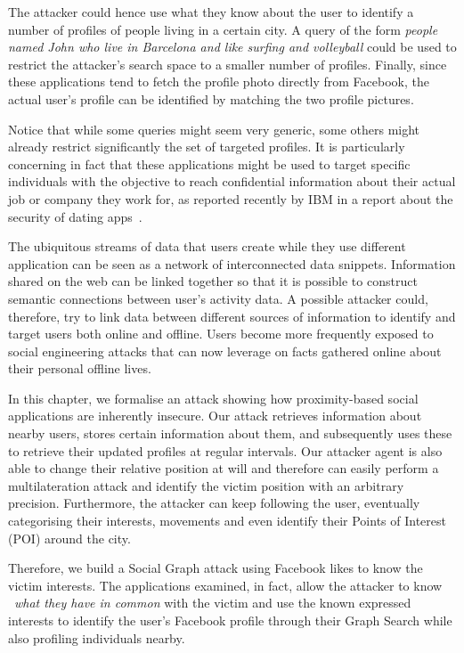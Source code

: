 The attacker could hence use what they know about the user to identify a number of profiles of people living in a certain city. A query of the form \emph{people named John who live in Barcelona and like surfing and volleyball} could be used to restrict the attacker's search space to a smaller number of profiles. Finally, since these applications tend to fetch the profile photo directly from Facebook, the actual user's profile can be identified by matching the two profile pictures.

Notice that while some queries might seem very generic, some others might already restrict significantly the set of targeted profiles. It is particularly concerning in fact that these applications might be used to target specific individuals with the objective to reach confidential information about their actual job or company they work for, as reported recently by IBM in a report about the security of dating apps~\cite{ibm2015report}.

The ubiquitous streams of data that users create while they use different application can be seen as a network of interconnected data snippets. Information shared on the web can be linked together so that it is possible to construct semantic connections between user's activity data. A possible attacker could, therefore, try to link data between different sources of information to identify and target users both online and offline. Users become more frequently exposed to social engineering attacks that can now leverage on facts gathered online about their personal offline lives.

In this chapter, we formalise an attack showing how proximity-based social applications are inherently insecure. Our attack retrieves information about nearby users, stores certain information about them, and subsequently uses these to retrieve their updated profiles at regular intervals. Our attacker agent is also able to change their relative position at will and therefore can easily perform a multilateration attack and identify the victim position with an arbitrary precision. Furthermore, the attacker can keep following the user, eventually categorising their interests, movements and even identify their Points of Interest (POI) around the city.

Therefore, we build a Social Graph attack using Facebook likes to know the victim interests. The applications examined, in fact, allow the attacker to know ~\emph{what they have in common} with the victim and use the known expressed interests to identify the user's Facebook profile through their Graph Search while also profiling individuals nearby.


